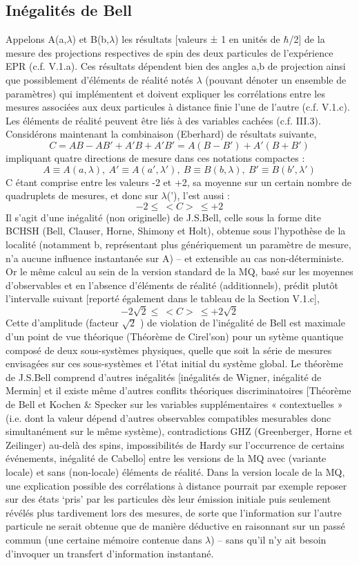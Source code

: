 \subsection{Inégalités de Bell}
Appelons A(a,$\lambda$) et B(b,$\lambda$) les résultats [valeurs ± 1 en unités
 de $\hbar$/2] de la mesure des
projections respectives de spin des deux particules de l’expérience EPR (c.f. V.1.a). Ces
résultats dépendent bien des angles a,b de projection ainsi que possiblement d’éléments de
réalité notés $\lambda$ (pouvant dénoter un ensemble de paramètres) qui
 implémentent et doivent
expliquer les corrélations entre les mesures associées aux deux particules à distance finie
l’une de l’autre (c.f. V.1.c). Les éléments de réalité peuvent être liés
 à des variables cachées
(c.f. III.3). Considérons maintenant la combinaison (Eberhard) de résultats suivante,
\[
C=AB-AB'+A'B+A'B'=A(B-B')+A'(B+B')
\]
impliquant quatre directions de mesure dans ces notations compactes :
\[
A\equiv A(a,\lambda),\ A'\equiv A(a',\lambda'),\ B\equiv B(b,\lambda),\ B'\equiv B(b',\lambda') 
\]
C étant comprise entre les valeurs -2 et +2, sa moyenne sur un certain nombre de quadruplets
de mesures, et donc sur $\lambda$(’), l’est aussi :
\[
-2\leqslant\ <C>\ \leqslant+2
\]
Il s’agit d’une inégalité (non originelle) de J.S.Bell, celle sous la forme dite BCHSH (Bell,
Clauser, Horne, Shimony et Holt), obtenue sous l’hypothèse de la localité (notamment b,
représentant plus génériquement un paramètre de mesure, n’a aucune influence instantanée
sur A) – et extensible au cas non-déterministe. Or le même calcul au sein de la version
standard de la MQ, basé sur les moyennes d’observables et en l’absence d’éléments de
réalité (additionnels), prédit plutôt l’intervalle suivant [reporté également dans le tableau de
la Section V.1.c],
\[-2\sqrt{2}\leqslant\ <C>\ \leqslant+2\sqrt{2}\]
Cette d’amplitude (facteur $\sqrt{2}$ ) de violation de l’inégalité de Bell est maximale d’un
point de vue théorique (Théorème de Cirel’son) pour un sytème quantique composé de deux
sous-systèmes physiques, quelle que soit la série de mesures envisagées sur ces sous-systèmes et
l’état initial du système global. Le théorème de J.S.Bell comprend d’autres inégalités
[inégalités de Wigner, inégalité de Mermin] et il existe même d’autres conflits théoriques
discriminatoires [Théorème de Bell et Kochen \& Specker sur les variables supplémentaires
« contextuelles » (i.e. dont la valeur dépend d’autres observables compatibles mesurables
donc simultanément sur le même système), contradictions GHZ (Greenberger, Horne et
Zeilinger) au-delà des spins, impossibilités de Hardy sur l’occurrence de certains
événements, inégalité de Cabello] entre les versions de la MQ avec (variante locale) et sans
(non-locale) éléments de réalité. Dans la version locale de la MQ, une explication possible
des corrélations à distance pourrait par exemple reposer sur des états ‘pris’ par les particules
dès leur émission initiale puis seulement révélés plus tardivement lors des mesures, de sorte
que l’information sur l’autre particule ne serait obtenue que de manière déductive en
raisonnant sur un passé commun (une certaine mémoire contenue dans $\lambda$) – sans qu’il n’y
ait besoin d’invoquer un transfert d’information instantané.
